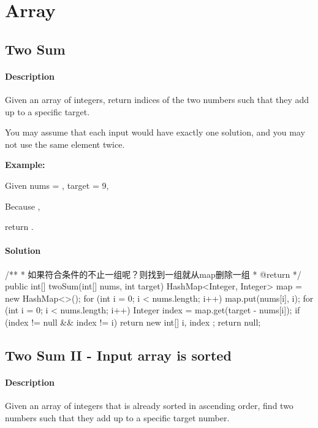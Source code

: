 \chapter{Array}

\section{Two Sum} %

\subsubsection{Description}
Given an array of integers, return indices of the two numbers such that they add up to a specific target.

You may assume that each input would have exactly one solution, and you may not use the same element twice.

\textbf{Example:}

Given nums = \code{[2, 7, 11, 15]}, target = 9,

Because ,

return \code{[0, 1]}.

\subsubsection{Solution}

\begin{Code}
/**
 * 如果符合条件的不止一组呢？则找到一组就从map删除一组
 * @return
 */
public int[] twoSum(int[] nums, int target) {
    HashMap<Integer, Integer> map = new HashMap<>();
    for (int i = 0; i < nums.length; i++) {
        map.put(nums[i], i);
    }
    for (int i = 0; i < nums.length; i++) {
        Integer index = map.get(target - nums[i]);
        if (index != null && index != i) {
            return new int[] {
                    i, index
            };
        }
    }
    return null;
}
\end{Code}

\newpage

\section{Two Sum II - Input array is sorted} %

\subsubsection{Description}
Given an array of integers that is already sorted in ascending order, find two numbers such that they add up to a specific target number.

